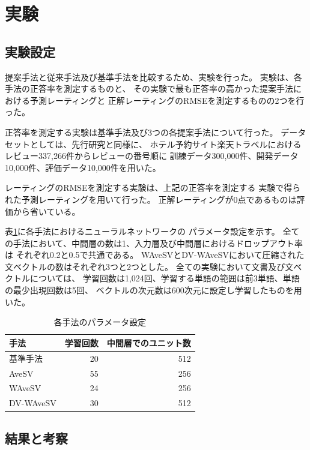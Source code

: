 \documentclass[twocolumn,a4paper]{ltjarticle}
\begin{document}
\section{実験}

\subsection{実験設定}

提案手法と従来手法\cite{fujitani15}及び基準手法を比較するため、実験を行った。
実験は、各手法の正答率を測定するものと、
その実験で最も正答率の高かった提案手法における予測レーティングと
正解レーティングのRMSEを測定するものの2つを行った。

正答率を測定する実験は基準手法及び3つの各提案手法について行った。
データセットとしては、先行研究\cite{fujitani15}と同様に、
ホテル予約サイト楽天トラベルにおけるレビュー337,266件からレビューの番号順に
訓練データ300,000件、開発データ10,000件、評価データ10,000件を用いた。

レーティングのRMSEを測定する実験は、上記の正答率を測定する
実験で得られた予測レーティングを用いて行った。
正解レーティングが0点であるものは評価から省いている。

表\ref{tab:ParametersOfMethods}に各手法におけるニューラルネットワークの
パラメータ設定を示す。
全ての手法において、中間層の数は1、入力層及び中間層におけるドロップアウト率は
それぞれ0.2と0.5で共通である。
WAveSVとDV-WAveSVにおいて圧縮された文ベクトルの数はそれぞれ3つと2つとした。
全ての実験において文書及び文ベクトルについては、
学習回数は1,024回、学習する単語の範囲は前3単語、単語の最少出現回数は5回、
ベクトルの次元数は600次元に設定し学習したものを用いた。

\begin{table}[b]
  \caption{各手法のパラメータ設定}
  \centering
  \begin{tabular}{l | r r} \label{tab:ParametersOfMethods}
    手法 & 学習回数 & 中間層でのユニット数 \\
    \hline
    基準手法  & 20 & 512 \\
    AveSV & 55 & 256 \\
    WAveSV & 24 & 256 \\
    DV-WAveSV & 30 & 512 \\
  \end{tabular}
\end{table}


\subsection{結果と考察}
\end{document}
